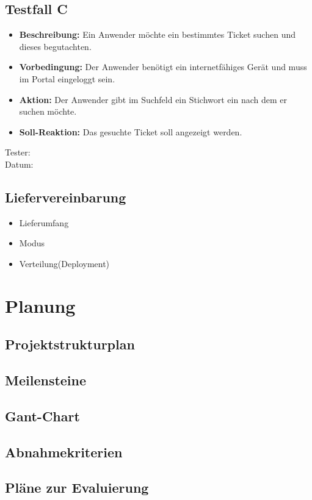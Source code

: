 \subsection{Testfall C}
\begin{itemize}
	\item \textbf{Beschreibung:} Ein Anwender möchte ein bestimmtes Ticket suchen und dieses begutachten. 
	\item \textbf{Vorbedingung:} Der Anwender benötigt ein internetfähiges Gerät und muss im Portal eingeloggt sein.
	\item \textbf{Aktion:} Der Anwender gibt im Suchfeld ein Stichwort ein nach dem er suchen möchte. 
	\item \textbf{Soll-Reaktion:} Das gesuchte Ticket soll angezeigt werden.
\end{itemize}
Tester:
\\
Datum:



\subsection{Liefervereinbarung}
\begin{itemize}
	\item Lieferumfang
	\item Modus
	\item Verteilung(Deployment)
\end{itemize}

\section{Planung}
\subsection{Projektstrukturplan}
\subsection{Meilensteine}
\subsection{Gant-Chart}
\subsection{Abnahmekriterien}
\subsection{Pläne zur Evaluierung}

